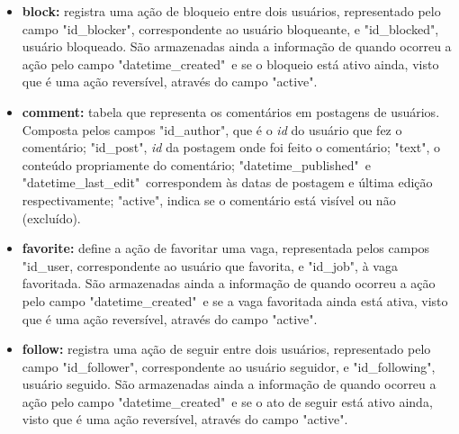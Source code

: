 \begin{itemize}
    \item \textbf{block:} registra uma ação de bloqueio entre dois usuários, representado pelo campo "id\_blocker", correspondente ao usuário bloqueante, e "id\_blocked", usuário bloqueado. São armazenadas ainda a informação de quando ocorreu a ação pelo campo "datetime\_created"\ e se o bloqueio está ativo ainda, visto que é uma ação reversível, através do campo "active".
    
    \item \textbf{comment:} tabela que representa os comentários em postagens de usuários. Composta pelos campos "id\_author", que é o \textit{id} do usuário que fez o comentário; "id\_post", \textit{id} da postagem onde foi feito o comentário; "text", o conteúdo propriamente do comentário; "datetime\_published"\ e "datetime\_last\_edit"\ correspondem às datas de postagem e última edição respectivamente; "active", indica se o comentário está visível ou não (excluído).
    
    \item \textbf{favorite:} define a ação de favoritar uma vaga, representada pelos campos "id\_user, correspondente ao usuário que favorita, e "id\_job", à vaga favoritada. São armazenadas ainda a informação de quando ocorreu a ação pelo campo "datetime\_created"\ e se a vaga favoritada ainda está ativa, visto que é uma ação reversível, através do campo "active".
    
    \item \textbf{follow:} registra uma ação de seguir entre dois usuários, representado pelo campo "id\_follower", correspondente ao usuário seguidor, e "id\_following", usuário seguido. São armazenadas ainda a informação de quando ocorreu a ação pelo campo "datetime\_created"\ e se o ato de seguir está ativo ainda, visto que é uma ação reversível, através do campo "active".
    

\end{itemize}
